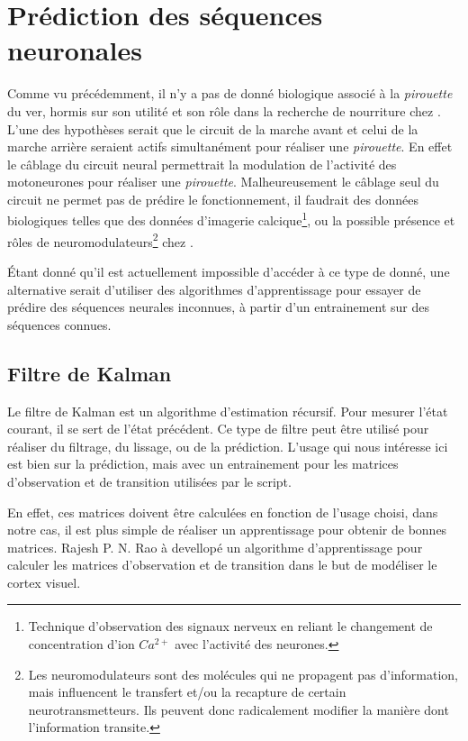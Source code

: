 \chapter{Prédiction des séquences neuronales} %
\label{cha:Prédire des séquences neuronales}

Comme vu précédemment, il n'y a pas de donné biologique associé à la
\textit{pirouette} du ver, hormis sur son utilité et son rôle dans la recherche
de nourriture chez \celeg{}\cite{Gray2005}. L'une des hypothèses serait que le
circuit de la marche avant et celui de la marche arrière seraient actifs
simultanément pour réaliser une \textit{pirouette}. En effet le câblage du
circuit neural permettrait la modulation de l'activité des motoneurones pour
réaliser une \textit{pirouette}. Malheureusement le câblage seul du circuit ne
permet pas de prédire le fonctionnement, il faudrait des données biologiques
telles que des données d'imagerie calcique\footnote{Technique d'observation des
signaux nerveux en reliant le changement de concentration d'ion $Ca^{2+}$ avec
l'activité des neurones.}, ou la possible présence et rôles de
neuromodulateurs\footnote{Les neuromodulateurs sont des molécules qui ne
propagent pas d'information, mais influencent le transfert et/ou la recapture
de certain neurotransmetteurs. Ils peuvent donc radicalement modifier la
manière dont l'information transite.} chez \celeg{}.

Étant donné qu'il est actuellement impossible d'accéder à ce type de donné, une
alternative serait d'utiliser des algorithmes d'apprentissage pour essayer de
prédire des séquences neurales inconnues, à partir d'un entrainement sur des séquences
connues.

\section{Filtre de Kalman} %
\label{sec:Filtre de Kalman}

Le filtre de Kalman est un algorithme d'estimation récursif. Pour mesurer
l'état courant, il se sert de l'état précédent. Ce type de filtre peut être
utilisé pour réaliser du filtrage, du lissage, ou de la prédiction. L'usage
qui nous intéresse ici est bien sur la prédiction, mais avec un entrainement
pour les matrices d'observation et de transition utilisées par le script.

En effet, ces matrices doivent être calculées en fonction de l'usage choisi,
dans notre cas, il est plus simple de réaliser un apprentissage pour obtenir de
bonnes matrices. Rajesh P. N. Rao à devellopé un algorithme d'apprentissage
pour calculer les matrices d'observation et de transition dans le but de modéliser
le cortex visuel\cite{Rao1999}.

